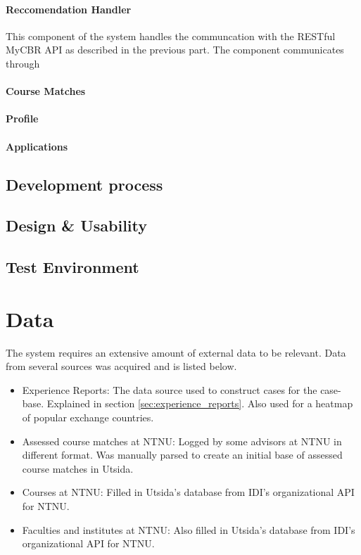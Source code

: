 \paragraph{Reccomendation Handler}
This component of the system handles the communcation with the RESTful MyCBR API as described in the previous part. The component communicates through

\paragraph{Course Matches}

\paragraph{Profile}

\paragraph{Applications}

\subsection{Development process}

\subsection{Design \& Usability}

\subsection{Test Environment}


\section{Data}

The system requires an extensive amount of external data to be relevant. Data from several sources was acquired and is listed below.

\begin{itemize}
    \item Experience Reports: The data source used to construct cases for the case-base. Explained in section \ref{sec:experience_reports}. Also used for a heatmap of popular exchange countries. 
    \item Assessed course matches at NTNU: Logged by some advisors at NTNU in different format. Was manually parsed to create an initial base of assessed course matches in Utsida.
    \item Courses at NTNU: Filled in Utsida's database from IDI's organizational API for NTNU. 
    \item Faculties and institutes at NTNU: Also filled in Utsida's database from IDI's organizational API for NTNU.
\end{itemize}

